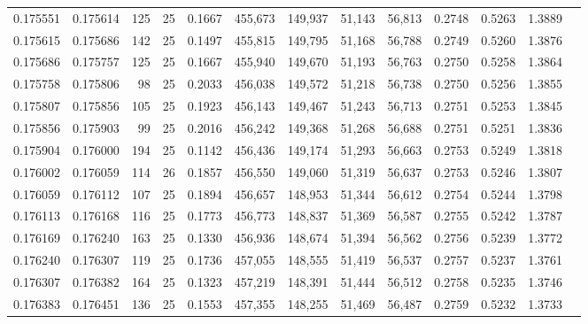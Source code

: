 \begin{tabular}{rrrrrrrrrrrrr}
0.175551 & 0.175614 &   125 &  25 &                                     0.1667 & 455,673 & 149,937 &  51,143 &  56,813 & 0.2748 & 0.5263 & 1.3889 \\
0.175615 & 0.175686 &   142 &  25 &                                     0.1497 & 455,815 & 149,795 &  51,168 &  56,788 & 0.2749 & 0.5260 & 1.3876 \\
0.175686 & 0.175757 &   125 &  25 &                                     0.1667 & 455,940 & 149,670 &  51,193 &  56,763 & 0.2750 & 0.5258 & 1.3864 \\
0.175758 & 0.175806 &    98 &  25 &                                     0.2033 & 456,038 & 149,572 &  51,218 &  56,738 & 0.2750 & 0.5256 & 1.3855 \\
0.175807 & 0.175856 &   105 &  25 &                                     0.1923 & 456,143 & 149,467 &  51,243 &  56,713 & 0.2751 & 0.5253 & 1.3845 \\
0.175856 & 0.175903 &    99 &  25 &                                     0.2016 & 456,242 & 149,368 &  51,268 &  56,688 & 0.2751 & 0.5251 & 1.3836 \\
0.175904 & 0.176000 &   194 &  25 &                                     0.1142 & 456,436 & 149,174 &  51,293 &  56,663 & 0.2753 & 0.5249 & 1.3818 \\
0.176002 & 0.176059 &   114 &  26 &                                     0.1857 & 456,550 & 149,060 &  51,319 &  56,637 & 0.2753 & 0.5246 & 1.3807 \\
0.176059 & 0.176112 &   107 &  25 &                                     0.1894 & 456,657 & 148,953 &  51,344 &  56,612 & 0.2754 & 0.5244 & 1.3798 \\
0.176113 & 0.176168 &   116 &  25 &                                     0.1773 & 456,773 & 148,837 &  51,369 &  56,587 & 0.2755 & 0.5242 & 1.3787 \\
0.176169 & 0.176240 &   163 &  25 &                                     0.1330 & 456,936 & 148,674 &  51,394 &  56,562 & 0.2756 & 0.5239 & 1.3772 \\
0.176240 & 0.176307 &   119 &  25 &                                     0.1736 & 457,055 & 148,555 &  51,419 &  56,537 & 0.2757 & 0.5237 & 1.3761 \\
0.176307 & 0.176382 &   164 &  25 &                                     0.1323 & 457,219 & 148,391 &  51,444 &  56,512 & 0.2758 & 0.5235 & 1.3746 \\
0.176383 & 0.176451 &   136 &  25 &                                     0.1553 & 457,355 & 148,255 &  51,469 &  56,487 & 0.2759 & 0.5232 & 1.3733 \\

\end{tabular}
